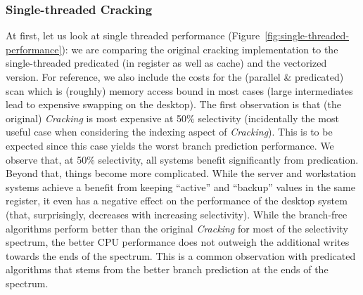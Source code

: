\subsubsection*{Single-threaded Cracking}
\label{sec:single-threaded}
At first, let us look at single threaded performance
(Figure~\ref{fig:single-threaded-performance}): we are comparing the
original cracking implementation to the single-threaded predicated (in
register as well as cache) and the vectorized version. For reference,
we also include the costs for the (parallel \& predicated) scan which
is (roughly) memory access bound in most cases (large intermediates
lead to expensive swapping on the desktop). The first observation is
that (the original) \emph{Cracking} is most expensive at 50\%
selectivity (incidentally the most useful case when considering the
indexing aspect of \emph{Cracking}). This is to be expected since this
case yields the worst branch prediction performance. We observe that,
at 50\% selectivity, all systems benefit significantly from
predication. Beyond that, things become more complicated. While the
server and workstation systems achieve a benefit from keeping
``active'' and ``backup'' values in the same register, it even has a
negative effect on the performance of the desktop system (that,
surprisingly, decreases with increasing selectivity). While the
branch-free algorithms perform better than the original
\emph{Cracking} for most of the selectivity spectrum, the better CPU
performance does not outweigh the additional writes towards the ends
of the spectrum. This is a common observation with predicated
algorithms that stems from the better branch prediction at the ends of
the spectrum.



